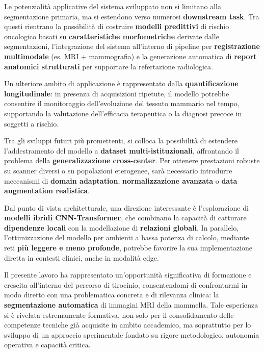 
Le potenzialità applicative del sistema sviluppato non si limitano alla segmentazione primaria, ma si estendono verso numerosi \textbf{downstream task}. Tra questi rientrano la possibilità di costruire \textbf{modelli predittivi} di rischio oncologico basati su \textbf{caratteristiche morfometriche} derivate dalle segmentazioni, l’integrazione del sistema all’interno di pipeline per \textbf{registrazione multimodale} (es. MRI + mammografia) e la generazione automatica di \textbf{report anatomici strutturati} per supportare la refertazione radiologica.

Un ulteriore ambito di applicazione è rappresentato dalla \textbf{quantificazione longitudinale}: in presenza di acquisizioni ripetute, il modello potrebbe consentire il monitoraggio dell’evoluzione del tessuto mammario nel tempo, supportando la valutazione dell’efficacia terapeutica o la diagnosi precoce in soggetti a rischio.


Tra gli sviluppi futuri più promettenti, si colloca la possibilità di estendere l’addestramento del modello a \textbf{dataset multi-istituzionali}, affrontando il problema della \textbf{generalizzazione cross-center}. Per ottenere prestazioni robuste su scanner diversi o su popolazioni eterogenee, sarà necessario introdurre meccanismi di \textbf{domain adaptation}, \textbf{normalizzazione avanzata} o \textbf{data augmentation realistica}.

Dal punto di vista architetturale, una direzione interessante è l’esplorazione di \textbf{modelli ibridi CNN-Transformer}, che combinano la capacità di catturare \textbf{dipendenze locali} con la modellazione di \textbf{relazioni globali}. In parallelo, l’ottimizzazione del modello per ambienti a bassa potenza di calcolo, mediante reti \textbf{più leggere e meno profonde}, potrebbe favorire la sua implementazione diretta in contesti clinici, anche in modalità edge.




Il presente lavoro ha rappresentato un'opportunità significativa di formazione e crescita all’interno del percorso di tirocinio, consentendomi di confrontarmi in modo diretto con una problematica concreta e di rilevanza clinica: la \textbf{segmentazione automatica} di immagini MRI della mammella. Tale esperienza si è rivelata estremamente formativa, non solo per il consolidamento delle competenze tecniche già acquisite in ambito accademico, ma soprattutto per lo sviluppo di un approccio sperimentale fondato su rigore metodologico, autonomia operativa e capacità critica.

